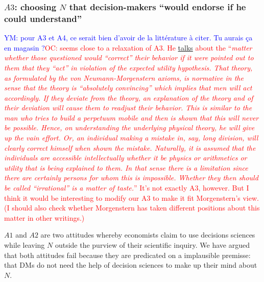\documentclass[preprint, french, english, 11pt, authoryear]{elsarticle}%
\newcommand{\protectforpdf}[1]{\texorpdfstring{\ensuremath{#1}}{#1}}
\newcommand{\commentYM}[1]{\textcolor{blue}{YM: #1}}
\newcommand{\commentOC}[1]{\textcolor{red}{OC: #1}}
\begin{document}
\subsubsection{\protectforpdf{A3}: choosing \protectforpdf{N} that decision-makers “would endorse if he could understand”}
\commentYM{pour A3 et A4, ce serait bien d'avoir de la littérature à citer. Tu aurais ça en magasin ?}\commentOC{\citet[p. 180]{morgenstern_reflections_1979} seems close to a relaxation of A3. He \href{https://raw.githubusercontent.com/YvesMeinard/properplace/182dc31f9c0b4246ef6fb8b2894b5e35b70f04d7/properplace.tex}{talks} about the “\emph{matter whether those questioned would “correct” their behavior if it were pointed out to them that they “act” in violation of the expected utility hypothesis. That theory, as formulated by the von Neumann-Morgenstern axioms, is normative in the sense that the theory is “absolutely convincing” which implies that men will act accordingly. If they deviate from the theory, an explanation of the theory and of their deviation will cause them to readjust their behavior. This is similar to the man who tries to build a perpetuum mobile and then is shown that this will never be possible. Hence, on understanding the underlying physical theory, he will give up the vain effort. Or, an individual making a mistake in, say, long division, will clearly correct himself when shown the mistake. Naturally, it is assumed that the individuals are accessible intellectually whether it be physics or arithmetics or utility that is being explained to them. In that sense there is a limitation since there are certainly persons for whom this is impossible. Whether they then should be called “irrational” is a matter of taste.}” It’s not exactly A3, however. But I think it would be interesting to modify our A3 to make it fit Morgenstern’s view. (I should also check whether Morgenstern has taken different positions about this matter in other writings.)}

$A1$ and $A2$ are two attitudes whereby economists claim to use decisions sciences while leaving $N$ outside the purview of their scientific inquiry. We have argued that both attitudes fail because they are predicated on a implausible premisse: that \acp{DM} do not need the help of decision sciences to make up their mind about $N$.
\end{document}
